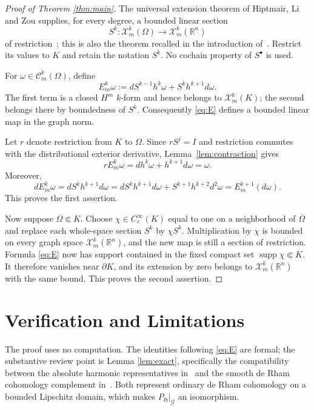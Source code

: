 \documentclass[11pt]{article}
\newcommand{\R}{\mathbb R}
\newcommand{\HH}{\mathfrak H}
\newcommand{\cC}{\mathcal C}
\newcommand{\cX}{\mathcal X}
\newcommand{\cG}{\mathcal G}
\begin{document}
\begin{proof}[Proof of Theorem \ref{thm:main}]
The universal extension theorem of Hiptmair, Li and Zou supplies, for every
degree, a bounded linear section
\[
 S^k:\cX_m^k(\Omega)\longrightarrow
       \cX_m^k(\R^n)
\]
of restriction~\cite{HiptmairLiZou}; this is also the theorem recalled in
the introduction of~\cite{NilssonPitassi}.  Restrict its values to $K$ and
retain the notation $S^k$.  No cochain property of $S^\bullet$ is used.

For $\omega\in\cC_m^k(\Omega)$, define
\begin{equation}\label{eq:E}
 E_m^k\omega
   :=dS^{k-1}h^k\omega+S^kh^{k+1}d\omega.
\end{equation}
The first term is a closed $H^m$ $k$-form and hence belongs to
$\cX_m^k(K)$; the second belongs there by boundedness of $S^k$.
Consequently \eqref{eq:E} defines a bounded linear map in the graph norm.

Let $r$ denote restriction from $K$ to $\Omega$.  Since $rS^j=I$ and
restriction commutes with the distributional exterior derivative,
Lemma~\ref{lem:contraction} gives
\[
 rE_m^k\omega=dh^k\omega+h^{k+1}d\omega=\omega.
\]
Moreover,
\[
 dE_m^k\omega=dS^kh^{k+1}d\omega
 =dS^kh^{k+1}d\omega+S^{k+1}h^{k+2}d^2\omega
 =E_m^{k+1}(d\omega).
\]
This proves the first assertion.

Now suppose $\Omega\Subset K$.  Choose
$\chi\in C_c^\infty(K)$ equal to one on a neighborhood of
$\overline\Omega$ and replace each whole-space section $S^k$ by
$\chi S^k$.  Multiplication by $\chi$ is bounded on every graph space
$\cX_m^k(\R^n)$, and the new map is still a section of restriction.
Formula \eqref{eq:E} now has support contained in the fixed compact set
$\operatorname{supp}\chi\Subset K$.  It therefore vanishes near
$\partial K$, and its extension by zero belongs to
$\cX_m^k(\R^n)$ with the same bound.  This proves the second assertion.
\end{proof}

\section*{Verification and Limitations}

The proof uses no computation.  The identities following
\eqref{eq:E} are formal; the substantive review point is Lemma
\ref{lem:exact}, specifically the compatibility between the absolute
harmonic representatives in~\cite{NilssonPitassi} and the smooth de Rham
cohomology complement in~\cite{CostabelMcIntosh}.  Both represent ordinary
de Rham cohomology on a bounded Lipschitz domain, which makes
$P_{\HH}|_{\cG}$ an isomorphism.
\end{document}
